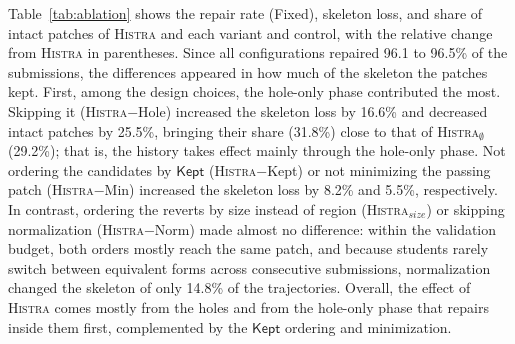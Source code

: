 \documentclass[10pt,conference]{IEEEtran}
\begin{document}
Table~\ref{tab:ablation} shows the repair rate (Fixed), skeleton loss, and share of intact patches of \textsc{Histra} and each variant and control, with the relative change from \textsc{Histra} in parentheses. Since all configurations repaired 96.1 to 96.5\% of the submissions, the differences appeared in how much of the skeleton the patches kept. First, among the design choices, the hole-only phase contributed the most. Skipping it (\textsc{Histra}$-$Hole) increased the skeleton loss by 16.6\% and decreased intact patches by 25.5\%, bringing their share (31.8\%) close to that of \textsc{Histra}$_{\emptyset}$ (29.2\%); that is, the history takes effect mainly through the hole-only phase. Not ordering the candidates by $\mathsf{Kept}$ (\textsc{Histra}$-$Kept) or not minimizing the passing patch (\textsc{Histra}$-$Min) increased the skeleton loss by 8.2\% and 5.5\%, respectively. In contrast, ordering the reverts by size instead of region (\textsc{Histra}$_{\mathit{size}}$) or skipping normalization (\textsc{Histra}$-$Norm) made almost no difference: within the validation budget, both orders mostly reach the same patch, and because students rarely switch between equivalent forms across consecutive submissions, normalization changed the skeleton of only 14.8\% of the trajectories. Overall, the effect of \textsc{Histra} comes mostly from the holes and from the hole-only phase that repairs inside them first, complemented by the $\mathsf{Kept}$ ordering and minimization.
\end{document}
